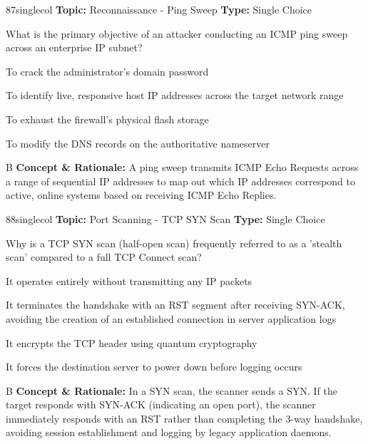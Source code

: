 \begin{qcard}{87}{singlecol}
\textcolor{darkslate!75}{\small\textbf{Topic:} Reconnaissance - Ping Sweep \hfill \textbf{Type:} Single Choice}\vspace{0.4em}\par
What is the primary objective of an attacker conducting an ICMP ping sweep across an enterprise IP subnet?
\begin{qoptions}
\item To crack the administrator's domain password
\item To identify live, responsive host IP addresses across the target network range
\item To exhaust the firewall's physical flash storage
\item To modify the DNS records on the authoritative nameserver
\end{qoptions}
\end{qcard}
\nopagebreak
\begin{explainbox}{B}
\textbf{Concept \& Rationale:} A ping sweep transmits ICMP Echo Requests across a range of sequential IP addresses to map out which IP addresses correspond to active, online systems based on receiving ICMP Echo Replies.
\end{explainbox}

\begin{qcard}{88}{singlecol}
\textcolor{darkslate!75}{\small\textbf{Topic:} Port Scanning - TCP SYN Scan \hfill \textbf{Type:} Single Choice}\vspace{0.4em}\par
Why is a TCP SYN scan (half-open scan) frequently referred to as a 'stealth scan' compared to a full TCP Connect scan?
\begin{qoptions}
\item It operates entirely without transmitting any IP packets
\item It terminates the handshake with an RST segment after receiving SYN-ACK, avoiding the creation of an established connection in server application logs
\item It encrypts the TCP header using quantum cryptography
\item It forces the destination server to power down before logging occurs
\end{qoptions}
\end{qcard}
\nopagebreak
\begin{explainbox}{B}
\textbf{Concept \& Rationale:} In a SYN scan, the scanner sends a SYN. If the target responds with SYN-ACK (indicating an open port), the scanner immediately responds with an RST rather than completing the 3-way handshake, avoiding session establishment and logging by legacy application daemons.
\end{explainbox}

